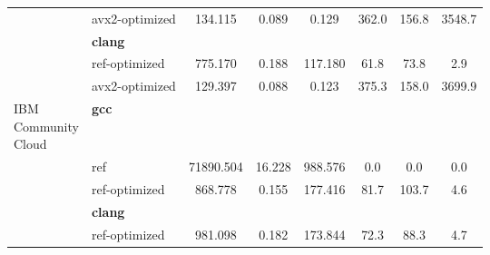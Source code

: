 \begin{table}[H]
\begin{tabularx}{\linewidth}{l l c c c c c c}
          & avx2-optimized & 134.115 & 0.089 & 0.129 & 362.0 & 156.8 & 3548.7\\
          & \textbf{clang} & & & & & \\
          & ref-optimized & 775.170 & 0.188 & 117.180 & 61.8 & 73.8 & 2.9\\
          & avx2-optimized & 129.397 & 0.088 & 0.123 & 375.3 & 158.0 & 3699.9\\
          \midrule
          \multirowcell{5}{IBM\\ Community\\ Cloud}
          & \textbf{gcc} & & & & & \\
          & ref & 71890.504 & 16.228 & 988.576 & 0.0 & 0.0 & 0.0\\
          & ref-optimized & 868.778 & 0.155 & 177.416 & 81.7 & 103.7 & 4.6\\
          & \textbf{clang} & & & & & \\
          & ref-optimized & 981.098 & 0.182 & 173.844 & 72.3 & 88.3 & 4.7\\
        \bottomrule
    \end{tabularx}
\end{table}